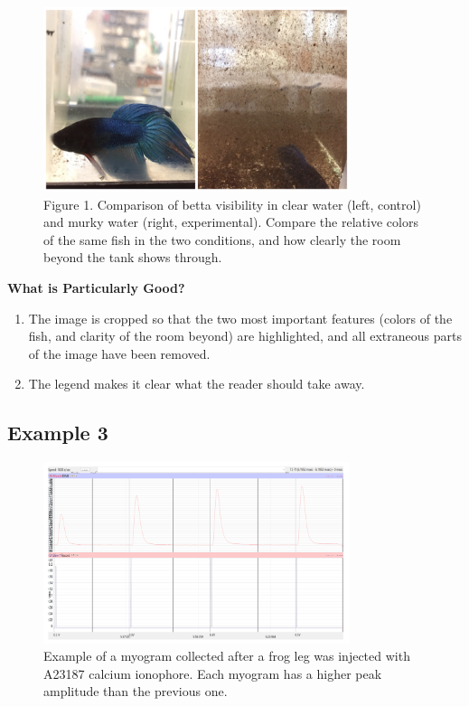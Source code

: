 \documentclass[
]{book}
\providecommand{\tightlist}{%
  \setlength{\itemsep}{0pt}\setlength{\parskip}{0pt}}
\begin{document}
\begin{figure}
\centering
\includegraphics[width=0.8\textwidth,height=\textheight]{images/Murky_water.png}
\caption{Figure 1. Comparison of betta visibility in clear water (left, control) and murky water (right, experimental). Compare the relative colors of the same fish in the two conditions, and how clearly the room beyond the tank shows through.}
\end{figure}

\textbf{What is Particularly Good?}

\begin{enumerate}
\def\labelenumi{\arabic{enumi}.}
\tightlist
\item
  The image is cropped so that the two most important features (colors of the fish, and clarity of the room beyond) are highlighted, and all extraneous parts of the image have been removed.
\item
  The legend makes it clear what the reader should take away.
\end{enumerate}

\hypertarget{example-3-10}{%
\subsection{Example 3}\label{example-3-10}}

\begin{figure}
\centering
\includegraphics[width=0.8\textwidth,height=\textheight]{images/Four_myograms.png}
\caption{Example of a myogram collected after a frog leg was injected with A23187 calcium ionophore. Each myogram has a higher peak amplitude than the previous one.}
\end{figure}
\end{document}
